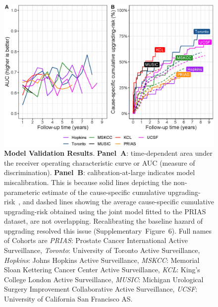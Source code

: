 \begin{figure}
\centerline{\includegraphics[width=\columnwidth]{images/auc_beforecalib.eps}}
\caption{\textbf{Model Validation Results}. \textbf{Panel~A}: time-dependent area under the receiver operating characteristic curve or AUC (measure of discrimination). \textbf{Panel~B}: calibration-at-large indicates model miscalibration. This is because solid lines depicting the non-parameteric estimate of the cause-specific cumulative upgrading-risk~\citep{turnbull1976empirical}, and dashed lines showing the average cause-specific cumulative upgrading-risk obtained using the joint model fitted to the PRIAS dataset, are not overlapping. Recalibrating the baseline hazard of upgrading resolved this issue (Supplementary~Figure~6). Full names of Cohorts are \textit{PRIAS}: Prostate Cancer International Active Surveillance, \textit{Toronto}: University of Toronto Active Surveillance, \textit{Hopkins}: Johns Hopkins Active Surveillance, \textit{MSKCC}: Memorial Sloan Kettering Cancer Center Active Surveillance, \textit{KCL}: King's College London Active Surveillance, \textit{MUSIC}: Michigan Urological Surgery Improvement Collaborative Active Surveillance, \textit{UCSF}: University of California San Francisco AS.}
\label{fig:auc_beforecalib}
\end{figure}

